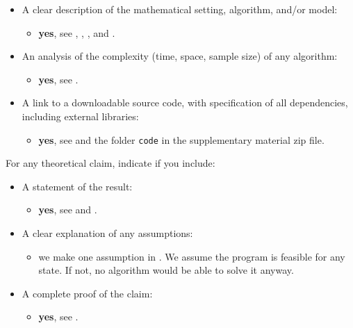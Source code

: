 \begin{itemize}
    \item  A clear description of the mathematical setting, algorithm, and/or model:
    
    \begin{itemize}\item \textbf{yes}, see , , ,
     and .
    \end{itemize}
    \item An analysis of the complexity (time, space, sample size) of any algorithm:
    \begin{itemize}\item \textbf{yes}, see .
    \end{itemize}
    \item A link to a downloadable source code, with specification of all dependencies, including external libraries:
    \begin{itemize}\item \textbf{yes}, see  and the folder \texttt{code} in the supplementary material zip file.
    \end{itemize}
\end{itemize}

For any theoretical claim, indicate if you include:

\begin{itemize}
    \item  A statement of the result:
     \begin{itemize}
        \item  \textbf{yes}, see  and .\end{itemize}
    \item A clear explanation of any assumptions:
    \begin{itemize}
        \item  we make one assumption in . We assume the program is feasible for any state. If not, no algorithm would be able to solve it anyway.\end{itemize}
    \item A complete proof of the claim:
    \begin{itemize}
        \item  \textbf{yes}, see . 
    \end{itemize}
\end{itemize}

